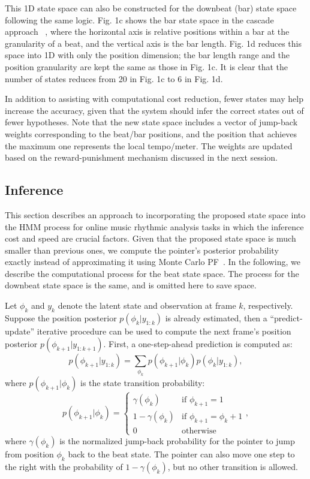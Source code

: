 \documentclass{article}
\begin{document}
This 1D state space can also be constructed for the downbeat (bar) state space following the same logic. Fig. 1c shows the bar state space in the cascade approach ~\cite{Heydari:2}, where the horizontal axis is relative positions within a bar at the granularity of a beat, and the vertical axis is the bar length. Fig. 1d reduces this space into 1D with only the position dimension; the bar length range and the position granularity are kept the same as those in Fig. 1c. It is clear that the number of states reduces from 20 in Fig. 1c to 6 in Fig. 1d. 


In addition to assisting with computational cost reduction, fewer states may help increase the accuracy, given that the system should infer the correct states out of fewer hypotheses. Note that the new state space includes a vector of jump-back weights corresponding to the beat/bar positions, and the position that achieves the maximum one represents the local tempo/meter.
The weights are updated based on the reward-punishment mechanism discussed in the next session.

\subsection{Inference}
\label{ssec:Inference}
This section describes an approach to incorporating the proposed state space into the HMM process for online music rhythmic analysis tasks in which the inference cost and speed are crucial factors. Given that the proposed state space is much smaller than previous ones, we compute the pointer's posterior probability exactly instead of approximating it using Monte Carlo PF~\cite{Heydari:2}. In the following, we describe the computational process for the beat state space. The process for the downbeat state space is the same, and is omitted here to save space.


Let $\phi_{k}$ and $y_{k}$ denote the latent state and observation at frame $k$, respectively. Suppose the position posterior $p(\phi_{k}|y_{1:k})$ is already estimated, then a ``predict-update'' iterative procedure can be used to compute the next frame's position posterior $p(\phi_{k+1}|y_{1:k+1})$. First, a one-step-ahead prediction is computed as: 
\begin{equation}
p(\phi_{k+1}|y_{1:k}) = \sum_{\phi_{k}} p(\phi_{k+1}|\phi_{k})p(\phi_{k}|y_{1:k}),
\end{equation}
where $p(\phi_{k+1}|\phi_{k})$ is the state transition probability:
\begin{equation}
    p( \phi_{k+1} |  \phi_{k}) =
      \left\{
        \begin{array}{ll}
            \gamma(\phi_{k}) & \text{if } \phi_{k+1}=1 \\
            1-\gamma(\phi_{k}) & \text{if } \phi_{k+1}=\phi_{k}+1\\ 
            0 &  \text{otherwise } 
        \end{array}
      \right. ,
\end{equation}
where $\gamma(\phi_{k})$ is the normalized jump-back probability for the pointer to jump from position $\phi_{k}$ back to the beat state. The pointer can also move one step to the right with the probability of $1-\gamma(\phi_{k})$, but no other transition is allowed.
\end{document}
